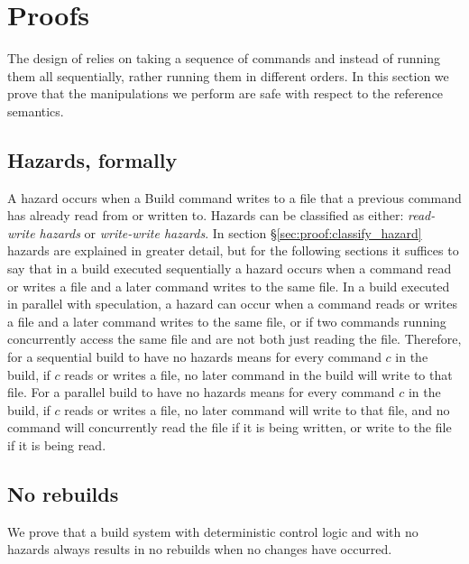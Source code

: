 \section{Proofs}
\label{sec:proof}

The design of \Rattle relies on taking a sequence of commands and instead of running them all sequentially, rather running them in different orders. In this section we prove that the manipulations we perform are safe with respect to the reference semantics.

\subsection{Hazards, formally}

A hazard occurs when a Build command writes to a file that a previous command has already read from or written to.  Hazards can be classified as either: \emph{read-write hazards} or \emph{write-write hazards}.  In section \S\ref{sec:proof:classify_hazard} hazards are explained in greater detail, but for the following sections it suffices to say that in a build executed sequentially a
hazard occurs when a command read or writes a file and a later command writes to the same file.  In a build executed in parallel with speculation, a hazard can occur when a command reads or writes a file and a later command writes to the same file, or if two commands running concurrently access the same file and are not both just reading the file.  Therefore, for a sequential \Rattle build to have no hazards means for every command $c$ in the build, if $c$ reads or writes a file, no later command in the build will write to that file.  For a parallel \Rattle build to have no hazards means for every command $c$ in the build, if $c$ reads or writes a file, no later command will write to that file, and no command will concurrently read the file if it is being written, or write to the file if it is being read.


\subsection{No rebuilds}
\label{sec:proof:no_rebuild}

We prove that a build system with deterministic control logic and with no hazards always results in no rebuilds when no changes have occurred.

